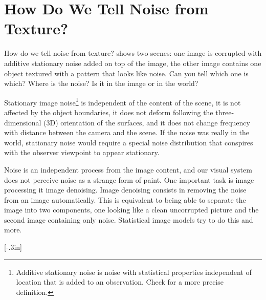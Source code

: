 %
%
%
%
%


\section{How Do We Tell Noise from Texture?}

How do we tell noise from texture? \Fig{\ref{fig:noiseInTheWorld}} shows two scenes:  one image is corrupted with additive stationary noise added on top of the image, the other image contains one object textured with a pattern that looks like noise. Can you tell which one is which? Where is the noise? Is it in the image or in the world?  


Stationary image noise\footnote{Additive stationary noise is noise with statistical properties independent of location that is added to an observation. Check \sect{\ref{sec:image_denoising_gaussian_model}} for a more precise definition.} is independent of the content of the scene, it is not affected by the object boundaries, it does not deform following the three-dimensional (3D) orientation of the surfaces, and it does not change frequency with distance between the camera and the scene. If the noise was really in the world, stationary noise would require a special noise distribution that conspires with the observer viewpoint to appear stationary. 

Noise is an independent process from the image content, and our visual system does not perceive noise as a strange form of paint. One important task is image processing it image denoising. Image denoising consists in removing the noise from an image automatically. This is equivalent to being able to separate the image into two components, one looking like a clean uncorrupted picture and the second image containing only noise. Statistical image models try to do this and more. 

[-.3in]

